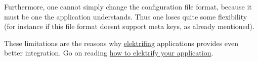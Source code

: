 Furthermore, one cannot simply change the configuration file format, because it must be one the application understands. Thus one loses quite some flexibility (for instance if this file format doesn\textquotesingle{}t support meta keys, as already mentioned).

These limitations are the reasons why \hyperlink{doc_help_elektra-glossary_md}{elektrifing} applications provides even better integration. Go on reading \hyperlink{doc_tutorials_application-integration_md}{how to elektrify your application}. 